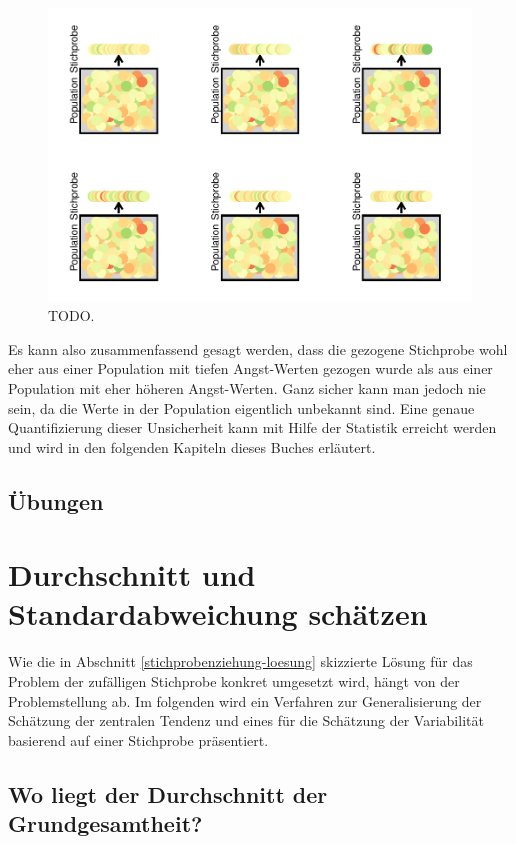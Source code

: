 \documentclass[
]{book}
\theoremstyle{definition}
\theoremstyle{definition}
\theoremstyle{definition}
\theoremstyle{definition}
\theoremstyle{remark}
\begin{document}
\begin{figure}
\centering
\includegraphics{aps_statistik1_files/figure-latex/srs-intervall-low-p-many-1.pdf}
\caption{\label{fig:srs-intervall-low-p-many}TODO.}
\end{figure}

Es kann also zusammenfassend gesagt werden, dass die gezogene Stichprobe wohl eher aus einer Population mit tiefen Angst-Werten gezogen wurde als aus einer Population mit eher höheren Angst-Werten. Ganz sicher kann man jedoch nie sein, da die Werte in der Population eigentlich unbekannt sind. Eine genaue Quantifizierung dieser Unsicherheit kann mit Hilfe der Statistik erreicht werden und wird in den folgenden Kapiteln dieses Buches erläutert.

\section{Übungen}\label{uxfcbungen}

\chapter{Durchschnitt und Standardabweichung schätzen}\label{durchschnitt-und-standardabweichung-schuxe4tzen}

Wie die in Abschnitt \ref{stichprobenziehung-loesung} skizzierte Lösung für das Problem der zufälligen Stichprobe konkret umgesetzt wird, hängt von der Problemstellung ab. Im folgenden wird ein Verfahren zur Generalisierung der Schätzung der zentralen Tendenz und eines für die Schätzung der Variabilität basierend auf einer Stichprobe präsentiert.

\section{Wo liegt der Durchschnitt der Grundgesamtheit?}\label{wo-liegt-der-durchschnitt-der-grundgesamtheit}
\end{document}
